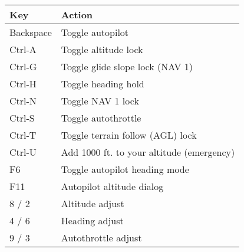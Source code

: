 \begin{tabular}{|l|l|}\hline
 Key              &         Action\\\hline
    Backspace     &         Toggle autopilot\\
    Ctrl-A        &         Toggle altitude lock \index{altitude hold}\\
    Ctrl-G        &         Toggle glide slope lock (NAV 1)\\
    Ctrl-H        &         Toggle heading hold\index{heading hold}\\
    Ctrl-N        &         Toggle NAV 1 lock\\
    Ctrl-S        &         Toggle autothrottle\index{autothrottle}\\
    Ctrl-T        &         Toggle terrain follow (AGL) lock\\
    Ctrl-U        &         Add 1000 ft. to your altitude (emergency)\\
    F6            &         Toggle autopilot heading mode\\
    F11           &         Autopilot altitude dialog\\\hline
    8 / 2         &         Altitude adjust\\
    4 / 6         &         Heading adjust\\
    9 / 3         &         Autothrottle adjust \\\hline
\end{tabular}

